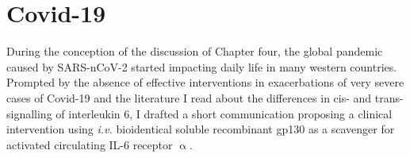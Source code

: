 
\chapter{Covid-19}

During the conception of the discussion of Chapter four, the global pandemic caused by SARS-nCoV-2 started impacting daily life in many western countries. Prompted by the absence of effective interventions in exacerbations of very severe cases of Covid-19 and the literature I read about the differences in cis- and trans-signalling of interleukin 6, I drafted a short communication proposing a clinical intervention using \emph{i.v.} bioidentical soluble recombinant gp130 as a scavenger for activated circulating IL-6 receptor $\upalpha$.